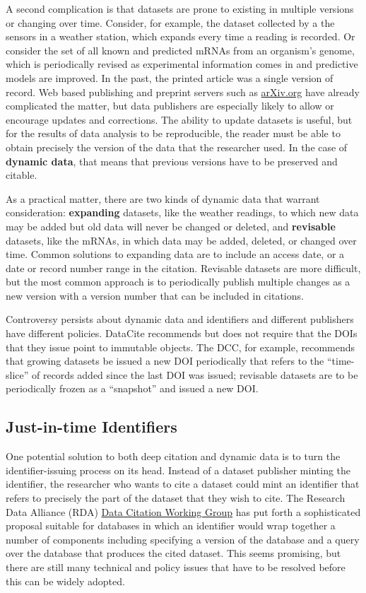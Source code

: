 \documentclass[10pt,twocolumn]{article}
\begin{document}
A second complication is that datasets are prone to existing in multiple versions or changing over time.
Consider, for example, the dataset collected by a the sensors in a weather station, which expands every time a reading is recorded.
Or consider the set of all known and predicted mRNAs from an organism's genome, which is periodically revised as experimental information comes in and predictive models are improved.
In the past, the printed article was a single version of record.
Web based publishing and preprint servers such as \href{http://arxiv.org/}{arXiv.org} have already complicated the matter, but data publishers are especially likely to allow or encourage updates and corrections.
The ability to update datasets is useful, but for the results of data analysis to be reproducible, the reader must be able to obtain precisely the version of the data that the researcher used.
In the case of \textbf{dynamic data}, that means that previous versions have to be preserved and citable.

As a practical matter, there are two kinds of dynamic data that warrant consideration: \textbf{expanding} datasets, like the weather readings, to which new data may be added but old data will never be changed or deleted, and \textbf{revisable} datasets, like the mRNAs, in which data may be added, deleted, or changed over time.
Common solutions to expanding data are to include an access date, or a date or record number range in the citation.
Revisable datasets are more difficult, but the most common approach is to periodically publish multiple changes as a new version with a version number that can be included in citations.

Controversy persists about dynamic data and identifiers and different publishers have different policies.
DataCite recommends but does not require that the DOIs that they issue point to immutable objects.
The DCC, for example, recommends that growing datasets be issued a new DOI periodically that refers to the ``time-slice'' of records added since the last DOI was issued; revisable datasets are to be periodically frozen as a ``snapshot'' and issued a new DOI.

\subsection*{Just-in-time Identifiers}\label{just-in-time-identifiers}

One potential solution to both deep citation and dynamic data is to turn the identifier-issuing process on its head.
Instead of a dataset publisher minting the identifier, the researcher who wants to cite a dataset could mint an identifier that refers to precisely the part of the dataset that they wish to cite.
The Research Data Alliance (RDA) \href{http://rd-alliance.org/working-groups/data-citation-wg.html}{Data Citation Working Group} has put forth a sophisticated proposal suitable for databases in which an identifier would wrap together a number of components including specifying a version of the database and a query over the database that produces the cited dataset.
This seems promising, but there are still many technical and policy issues that have to be resolved before this can be widely adopted.
\end{document}
